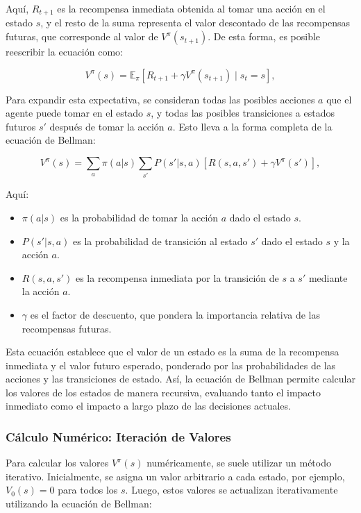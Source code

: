 \documentclass[a4paper,12pt, twoside]{report}
\begin{document}
Aquí, \(R_{t+1}\) es la recompensa inmediata obtenida al tomar una acción en el estado \(s\), 
y el resto de la suma representa el valor descontado de las recompensas futuras, que 
corresponde al valor de \(V^\pi(s_{t+1})\). De esta forma, es posible reescribir la ecuación como:

\begin{equation}
V^\pi(s) = \mathbb{E}_\pi \left[ R_{t+1} + \gamma V^\pi(s_{t+1}) \mid s_t = s \right],
\end{equation}

Para expandir esta expectativa, se consideran todas las posibles acciones \(a\) que el agente 
puede tomar en el estado \(s\), y todas las posibles transiciones a estados futuros \(s'\) 
después de tomar la acción \(a\). Esto lleva a la forma completa de la ecuación de Bellman:

\begin{equation}
V^\pi(s) = \sum_{a} \pi(a|s) \sum_{s'} P(s'|s,a) \left[ R(s,a,s') + \gamma V^\pi(s') \right],
\end{equation}

Aquí:
\begin{itemize}
    \item \(\pi(a|s)\) es la probabilidad de tomar la acción \(a\) dado el estado \(s\).
    \item \(P(s'|s,a)\) es la probabilidad de transición al estado \(s'\) dado el estado \(s\) y la acción \(a\).
    \item \(R(s,a,s')\) es la recompensa inmediata por la transición de \(s\) a \(s'\) mediante la acción \(a\).
    \item \(\gamma\) es el factor de descuento, que pondera la importancia relativa de las recompensas futuras.
\end{itemize}

Esta ecuación establece que el valor de un estado es la suma de la recompensa inmediata 
y el valor futuro esperado, ponderado por las probabilidades de las acciones y las 
transiciones de estado. Así, la ecuación de Bellman permite calcular los valores de 
los estados de manera recursiva, evaluando tanto el impacto inmediato como el impacto a 
largo plazo de las decisiones actuales.

\subsubsection{Cálculo Numérico: Iteración de Valores}

Para calcular los valores \(V^\pi(s)\) numéricamente, se suele utilizar un método iterativo. 
Inicialmente, se asigna un valor arbitrario a cada estado, por ejemplo, \(V_0(s) = 0\) para 
todos los \(s\). Luego, estos valores se actualizan iterativamente utilizando la ecuación de 
Bellman:
\end{document}

